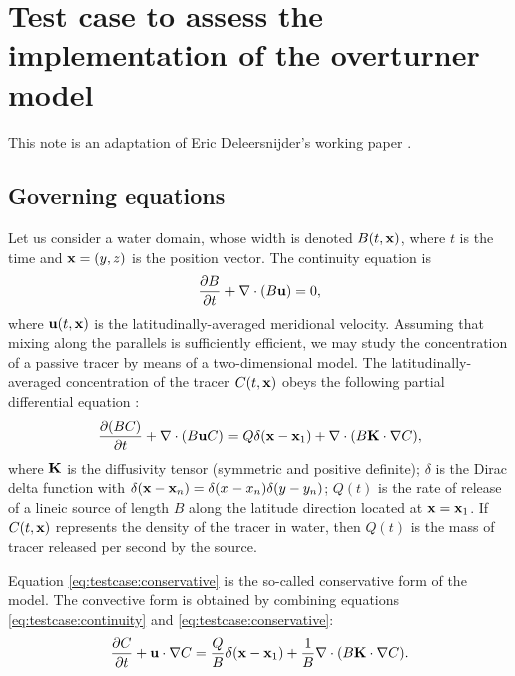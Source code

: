 \section*{Test case to assess the implementation of the overturner model}
This note is an adaptation of Eric Deleersnijder's working paper \cite{deleersnijder2011test}.

\subsection*{Governing equations}
Let us consider a water domain, whose width is denoted $B(t,\mathbf{x})$, where $t$ is the time and $\mathbf{x} = (y,z)$ is the position vector. The continuity equation is
\begin{equation} \label{eq:testcase:continuity}
	\frac{\partial B}{\partial t} + \nabla \cdot (B\mathbf{u}) = 0,
\end{equation}
where $\mathbf{u}(t,\mathbf{x})$ is the latitudinally-averaged meridional velocity. Assuming that mixing along the parallels is sufficiently efficient, we may study the concentration of a passive tracer by means of a two-dimensional model. The latitudinally-averaged concentration of the tracer $C(t,\mathbf{x})$ obeys the following partial differential equation :
\begin{equation} \label{eq:testcase:conservative}
	\frac{\partial (BC)}{\partial t} + \nabla \cdot (B \mathbf{u} C) = Q\delta(\mathbf{x} - \mathbf{x}_1) + \nabla \cdot (B\mathbf{K} \cdot \nabla C), 
\end{equation}
where $\mathbf{K}$ is the diffusivity tensor (symmetric and positive definite); $\delta$ is the Dirac delta function with $\delta(\mathbf{x}-\mathbf{x}_n) = \delta(x-x_n)\delta(y-y_n)$; $Q(t)$ is the rate of release of a lineic source of length $B$ along the latitude direction located at $\mathbf{x} = \mathbf{x}_1$. If $C(t,\mathbf x)$ represents the 
density of the tracer in water, then $Q(t)$ is the mass of tracer released per second by the source.

Equation \eqref{eq:testcase:conservative} is the so-called conservative form of the model. The convective form is obtained by combining equations \eqref{eq:testcase:continuity} and \eqref{eq:testcase:conservative}:
\begin{equation}  \label{eq:testcase:convective}
	\frac{\partial C}{\partial t} + \mathbf{u} \cdot \nabla C = \frac{Q}{B} \delta(\mathbf{x} - \mathbf{x}_1) + \frac{1}{B} \nabla \cdot (B\mathbf{K} \cdot \nabla C).
\end{equation}

